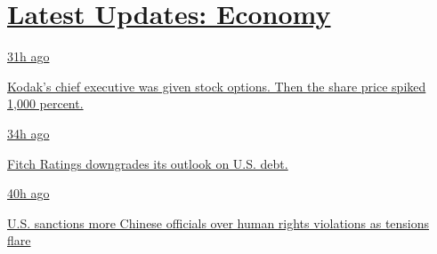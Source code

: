 \hypertarget{latest-updates-economy}{%
\section{\texorpdfstring{\href{https://www.nytimes3xbfgragh.onion/live/2020/07/31/business/stock-market-today-coronavirus?action=click\&pgtype=Article\&state=default\&region=MAIN_CONTENT_1\&context=storylines_live_updates}{Latest
Updates:
Economy}}{Latest Updates: Economy}}\label{latest-updates-economy}}

\href{https://www.nytimes3xbfgragh.onion/live/2020/07/31/business/stock-market-today-coronavirus?action=click\&pgtype=Article\&state=default\&region=MAIN_CONTENT_1\&context=storylines_live_updates\#kodaks-chief-executive-was-given-stock-options-then-the-share-price-spiked-1000-percent}{31h
ago}

\href{https://www.nytimes3xbfgragh.onion/live/2020/07/31/business/stock-market-today-coronavirus?action=click\&pgtype=Article\&state=default\&region=MAIN_CONTENT_1\&context=storylines_live_updates\#kodaks-chief-executive-was-given-stock-options-then-the-share-price-spiked-1000-percent}{Kodak's
chief executive was given stock options. Then the share price spiked
1,000 percent.}

\href{https://www.nytimes3xbfgragh.onion/live/2020/07/31/business/stock-market-today-coronavirus?action=click\&pgtype=Article\&state=default\&region=MAIN_CONTENT_1\&context=storylines_live_updates\#fitch-ratings-downgrades-its-outlook-on-us-debt}{34h
ago}

\href{https://www.nytimes3xbfgragh.onion/live/2020/07/31/business/stock-market-today-coronavirus?action=click\&pgtype=Article\&state=default\&region=MAIN_CONTENT_1\&context=storylines_live_updates\#fitch-ratings-downgrades-its-outlook-on-us-debt}{Fitch
Ratings downgrades its outlook on U.S. debt.}

\href{https://www.nytimes3xbfgragh.onion/live/2020/07/31/business/stock-market-today-coronavirus?action=click\&pgtype=Article\&state=default\&region=MAIN_CONTENT_1\&context=storylines_live_updates\#us-sanctions-more-chinese-officials-over-human-rights-violations-as-tensions-flare}{40h
ago}

\href{https://www.nytimes3xbfgragh.onion/live/2020/07/31/business/stock-market-today-coronavirus?action=click\&pgtype=Article\&state=default\&region=MAIN_CONTENT_1\&context=storylines_live_updates\#us-sanctions-more-chinese-officials-over-human-rights-violations-as-tensions-flare}{U.S.
sanctions more Chinese officials over human rights violations as
tensions flare}

